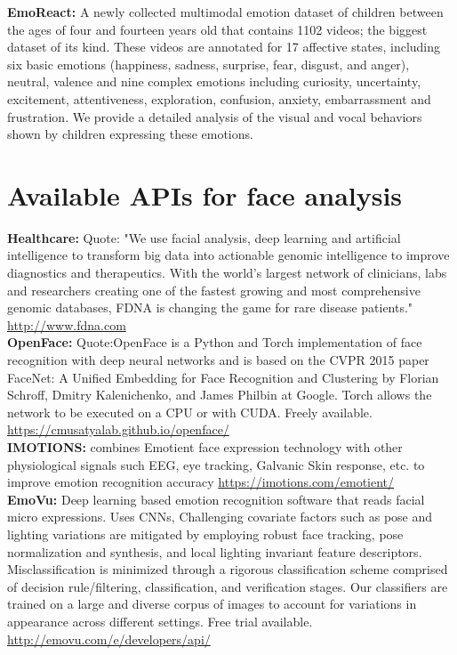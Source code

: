 \textbf{EmoReact:} A newly collected multimodal emotion dataset of children between the ages of four and fourteen years old that contains 1102 videos; the biggest dataset of its kind. These videos are annotated for 17 affective states, including six basic emotions (happiness, sadness, surprise, fear, disgust, and anger), neutral, valence and nine complex emotions including curiosity, uncertainty, excitement, attentiveness, exploration, confusion, anxiety, embarrassment and frustration. We provide a detailed analysis of the visual and vocal behaviors shown by children expressing these emotions.
\section{Available APIs for face analysis}

\textbf{Healthcare:} 
Quote: "We use facial analysis, deep learning and artificial intelligence to transform big data into actionable genomic intelligence to improve diagnostics and therapeutics. With the world’s largest network of clinicians, labs and researchers creating one of the fastest growing and most comprehensive genomic databases, FDNA is changing the game for rare disease patients."
\url{http://www.fdna.com}\\


\textbf{OpenFace:}
Quote:OpenFace is a Python and Torch implementation of face recognition with deep neural networks and is based on the CVPR 2015 paper FaceNet: A Unified Embedding for Face Recognition and Clustering by Florian Schroff, Dmitry Kalenichenko, and James Philbin at Google. Torch allows the network to be executed on a CPU or with CUDA. Freely available. \url{https://cmusatyalab.github.io/openface/}\\

\textbf{IMOTIONS:} combines Emotient face expression technology with other physiological signals such EEG, eye tracking, Galvanic Skin response, etc. to improve emotion recognition accuracy
\url{https://imotions.com/emotient/}\\

\textbf{EmoVu:} Deep learning based emotion recognition software that reads facial micro expressions. Uses CNNs, Challenging covariate factors such as pose and lighting variations are mitigated by employing robust face tracking, pose normalization and synthesis, and local lighting invariant feature descriptors. Misclassification is minimized through a rigorous classification scheme comprised of decision rule/filtering, classification, and verification stages. Our classifiers are trained on a large and diverse corpus of images to account for variations in appearance across different settings. Free trial available.
\url{http://emovu.com/e/developers/api/} \\

